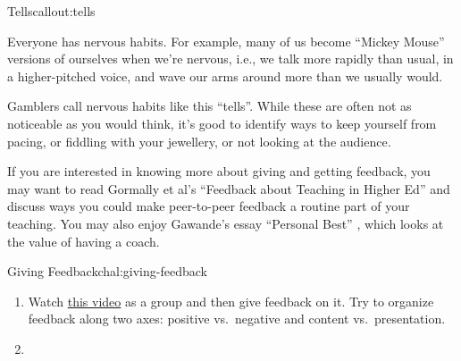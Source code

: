 \begin{callout}{Tells}{callout:tells}

Everyone has nervous habits. For example, many of us become ``Mickey
Mouse'' versions of ourselves when we're nervous, i.e., we talk more
rapidly than usual, in a higher-pitched voice, and wave our arms
around more than we usually would.

Gamblers call nervous habits like this ``tells''.  While these are
often not as noticeable as you would think, it's good to identify ways
to keep yourself from pacing, or fiddling with your jewellery, or not
looking at the audience.

\end{callout}

If you are interested in knowing more about giving and getting
feedback, you may want to read Gormally et al's ``Feedback about
Teaching in Higher Ed'' \cite{bib:gormally-teaching-feedback} and
discuss ways you could make peer-to-peer feedback a routine part of
your teaching.  You may also enjoy Gawande's essay ``Personal Best''
\cite{bib:gawande-personal-best}, which looks at the value of having a
coach.


\begin{challenge}{Giving Feedback}{chal:giving-feedback}

\begin{enumerate}

\item
  Watch \href{https://www.youtube.com/watch?v=-ApVt04rB4U}{this video}
  as a group and then give feedback on it. Try to organize feedback
  along two axes: positive vs.\ negative and content vs.\
  presentation.

\item

\end{enumerate}

\end{challenge}

